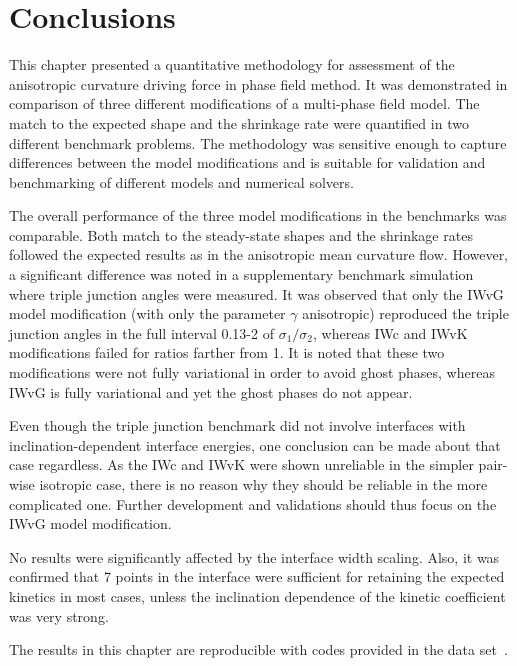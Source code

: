 \section{Conclusions}
This chapter presented a quantitative methodology for assessment of the anisotropic curvature driving force in phase field method. It was demonstrated in comparison of three different modifications of a multi-phase field model. The match to the expected shape and the shrinkage rate were quantified in two different benchmark problems. The methodology was sensitive enough to capture differences between the model modifications and is suitable for validation and benchmarking of different models and numerical solvers.

The overall performance of the three model modifications in the benchmarks was comparable. Both match to the steady-state shapes and the shrinkage rates followed the expected results as in the anisotropic mean curvature flow. However, a significant difference was noted in a supplementary benchmark simulation where triple junction angles were measured. It was observed that only the IWvG model modification (with only the parameter $\gamma$ anisotropic) reproduced the triple junction angles in the full interval 0.13-2 of $\sigma_1/\sigma_2$, whereas IWc and IWvK modifications failed for ratios farther from 1. It is noted that these two modifications were not fully variational in order to avoid ghost phases, whereas IWvG is fully variational and yet the ghost phases do not appear.

Even though the triple junction benchmark did not involve interfaces with inclination-dependent interface energies, one conclusion can be made about that case regardless. As the IWc and IWvK were shown unreliable in the simpler pair-wise isotropic case, there is no reason why they should be reliable in the more complicated one. Further development and validations should thus focus on the IWvG model modification.


No results were significantly affected by the interface width scaling. Also, it was confirmed that 7 points in the interface were sufficient for retaining the expected kinetics in most cases, unless the inclination dependence of the kinetic coefficient was very strong.

The results in this chapter are reproducible with codes provided in the data set~\cite{Minar2022dataset}.
	
	
	

